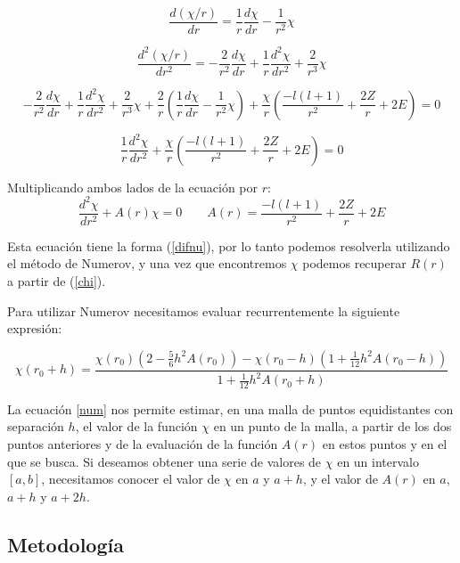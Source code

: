 \documentclass[12pt,a4paper]{report}
\begin{document}
\begin{equation}
\frac{d(\chi /r)}{dr}=\frac{1}{r}\frac{d\chi}{dr}-\frac{1}{r^2}\chi
\end{equation}

\begin{equation}
\frac{d^2(\chi/r)}{dr^2}=-\frac{2}{r^2}\frac{d\chi}{dr}+\frac{1}{r}\frac{d^2\chi}{dr^2}+\frac{2}{r^3}\chi
\end{equation}

\begin{equation}
-\frac{2}{r^2}\frac{d\chi}{dr}+\frac{1}{r}\frac{d^2\chi}{dr^2}+\frac{2}{r^3}\chi + \frac{2}{r} \left( \frac{1}{r}\frac{d\chi}{dr}-\frac{1}{r^2}\chi \right) + \frac{\chi}{r}\left( \frac{-l(l+1)}{r^2} + \frac{2Z}{r}+ 2E \right)=0
\end{equation}

\begin{equation}
\frac{1}{r}\frac{d^2\chi}{dr^2} + \frac{\chi}{r}\left( \frac{-l(l+1)}{r^2} + \frac{2Z}{r}+ 2E \right)=0
\end{equation}

Multiplicando ambos lados de la ecuación por $r$:
\begin{equation}\label{hfin}
\frac{d^2\chi}{dr^2} + A(r) \chi=0 \qquad A(r)=\frac{-l(l+1)}{r^2} + \frac{2Z}{r}+ 2E
\end{equation}

Esta ecuación tiene la forma (\ref{difnu}), por lo tanto podemos resolverla utilizando el método de Numerov, y una vez que encontremos $\chi$ podemos recuperar $R(r)$ a partir de (\ref{chi}). 

Para utilizar Numerov necesitamos evaluar recurrentemente la siguiente expresión:

\begin{equation}\label{num}
\chi(r_0+h)=\frac{\chi(r_0)(2-\frac{5}{6}h^2 A(r_0))-\chi(r_0-h)(1+\frac{1}{12}h^2 A(r_0-h))}{1+\frac{1}{12}h^2 A(r_0+h)}
\end{equation}

La ecuación \ref{num} nos permite estimar, en una malla de puntos equidistantes con separación $h$, el valor de la función $\chi$ en un punto de la malla, a partir de los dos puntos anteriores y de la evaluación de la función $A(r)$ en estos puntos y en el que se busca. Si deseamos obtener una serie de valores de $\chi$ en un intervalo $\left[a,b \right]$, necesitamos conocer el valor de $\chi$ en $a$ y $a+h$, y el valor de $A(r)$ en $a$, $a+h$ y $a+2h$.

\subsection*{Metodología}
\end{document}
